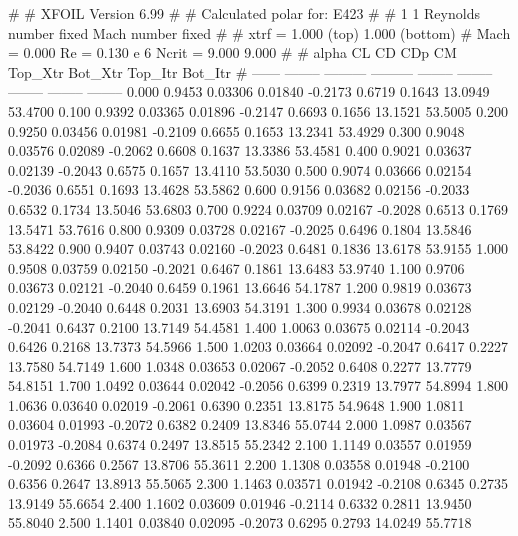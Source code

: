 #  
#       XFOIL         Version 6.99
#  
# Calculated polar for: E423                                            
#  
# 1 1 Reynolds number fixed          Mach number fixed         
#  
# xtrf =   1.000 (top)        1.000 (bottom)  
# Mach =   0.000     Re =     0.130 e 6     Ncrit =   9.000  9.000
#  
#   alpha    CL        CD       CDp       CM     Top_Xtr  Bot_Xtr  Top_Itr  Bot_Itr
#  ------ -------- --------- --------- -------- -------- -------- -------- --------
   0.000   0.9453   0.03306   0.01840  -0.2173   0.6719   0.1643  13.0949  53.4700
   0.100   0.9392   0.03365   0.01896  -0.2147   0.6693   0.1656  13.1521  53.5005
   0.200   0.9250   0.03456   0.01981  -0.2109   0.6655   0.1653  13.2341  53.4929
   0.300   0.9048   0.03576   0.02089  -0.2062   0.6608   0.1637  13.3386  53.4581
   0.400   0.9021   0.03637   0.02139  -0.2043   0.6575   0.1657  13.4110  53.5030
   0.500   0.9074   0.03666   0.02154  -0.2036   0.6551   0.1693  13.4628  53.5862
   0.600   0.9156   0.03682   0.02156  -0.2033   0.6532   0.1734  13.5046  53.6803
   0.700   0.9224   0.03709   0.02167  -0.2028   0.6513   0.1769  13.5471  53.7616
   0.800   0.9309   0.03728   0.02167  -0.2025   0.6496   0.1804  13.5846  53.8422
   0.900   0.9407   0.03743   0.02160  -0.2023   0.6481   0.1836  13.6178  53.9155
   1.000   0.9508   0.03759   0.02150  -0.2021   0.6467   0.1861  13.6483  53.9740
   1.100   0.9706   0.03673   0.02121  -0.2040   0.6459   0.1961  13.6646  54.1787
   1.200   0.9819   0.03673   0.02129  -0.2040   0.6448   0.2031  13.6903  54.3191
   1.300   0.9934   0.03678   0.02128  -0.2041   0.6437   0.2100  13.7149  54.4581
   1.400   1.0063   0.03675   0.02114  -0.2043   0.6426   0.2168  13.7373  54.5966
   1.500   1.0203   0.03664   0.02092  -0.2047   0.6417   0.2227  13.7580  54.7149
   1.600   1.0348   0.03653   0.02067  -0.2052   0.6408   0.2277  13.7779  54.8151
   1.700   1.0492   0.03644   0.02042  -0.2056   0.6399   0.2319  13.7977  54.8994
   1.800   1.0636   0.03640   0.02019  -0.2061   0.6390   0.2351  13.8175  54.9648
   1.900   1.0811   0.03604   0.01993  -0.2072   0.6382   0.2409  13.8346  55.0744
   2.000   1.0987   0.03567   0.01973  -0.2084   0.6374   0.2497  13.8515  55.2342
   2.100   1.1149   0.03557   0.01959  -0.2092   0.6366   0.2567  13.8706  55.3611
   2.200   1.1308   0.03558   0.01948  -0.2100   0.6356   0.2647  13.8913  55.5065
   2.300   1.1463   0.03571   0.01942  -0.2108   0.6345   0.2735  13.9149  55.6654
   2.400   1.1602   0.03609   0.01946  -0.2114   0.6332   0.2811  13.9450  55.8040
   2.500   1.1401   0.03840   0.02095  -0.2073   0.6295   0.2793  14.0249  55.7718

